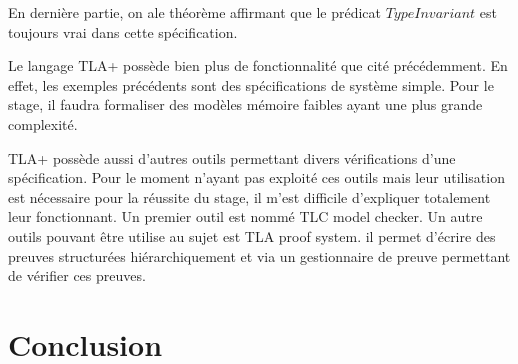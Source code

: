 \documentclass[12pt,a4paper]{article}
\begin{document}
En dernière partie, on ale théorème affirmant que le prédicat $TypeInvariant$ est toujours vrai dans cette spécification.

Le langage TLA+ possède bien plus de fonctionnalité que cité précédemment. En effet, les exemples précédents sont des spécifications de système simple. Pour le stage, il faudra formaliser des modèles mémoire faibles ayant une plus grande complexité.  

TLA+ possède aussi d'autres outils permettant divers vérifications d'une spécification. Pour le moment n'ayant pas exploité ces outils mais leur utilisation est nécessaire pour la réussite du stage, il m'est difficile d'expliquer totalement leur fonctionnant. Un premier outil est nommé TLC model checker. Un autre outils pouvant être utilise au sujet est TLA proof system. il permet d'écrire des preuves structurées hiérarchiquement et via un gestionnaire de preuve permettant de vérifier ces preuves.  

\section{Conclusion}



\nocite{Alglave:2009:SPA:1481839.1481842, Owens:2010:RIC:1883978.1884011, PETRI, Saraswat:2007:TMM:1229428.1229469, Sewell:2010:XRU:1785414.1785443, Turon:2014:GNW:2714064.2660243, Boehm:2011:YDK:2076796.2088916}
\end{document}
